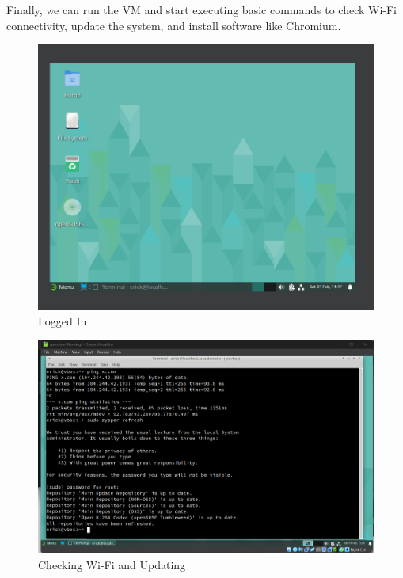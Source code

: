 \documentclass{article}
\begin{document}
Finally, we can run the VM and start executing basic commands to check Wi-Fi connectivity, update the system, and install software like Chromium.

\begin{figure}[H]
	\centering
	\includegraphics[width=1\textwidth]{wm.png}
	\caption{Logged In}
	\label{fig:5}
\end{figure}

\begin{figure}[H]
	\centering
	\includegraphics[width=1\textwidth]{su.png}
	\caption{Checking Wi-Fi and Updating}
	\label{fig:6}
\end{figure}
\end{document}
